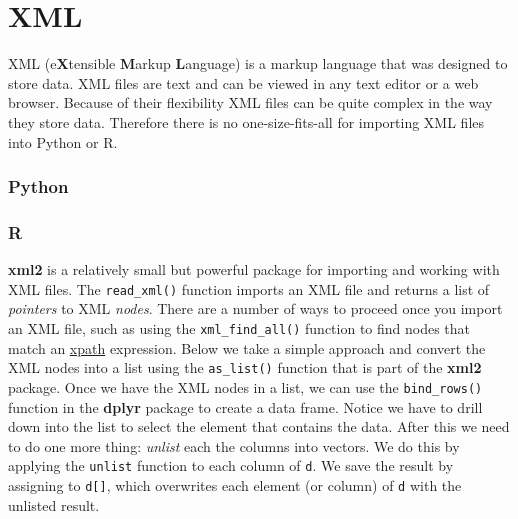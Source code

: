 \documentclass[
]{book}
\begin{document}
\hypertarget{xml}{%
\section{XML}\label{xml}}

XML (e\textbf{X}tensible \textbf{M}arkup \textbf{L}anguage) is a markup language that was designed to store data. XML files are text and can be viewed in any text editor or a web browser. Because of their flexibility XML files can be quite complex in the way they store data. Therefore there is no one-size-fits-all for importing XML files into Python or R.

\hypertarget{python-13}{%
\subsubsection*{Python}\label{python-13}}

\hypertarget{r-13}{%
\subsubsection*{R}\label{r-13}}

\textbf{xml2} is a relatively small but powerful package for importing and working with XML files. The \texttt{read\_xml()} function imports an XML file and returns a list of \emph{pointers} to XML \emph{nodes}. There are a number of ways to proceed once you import an XML file, such as using the \texttt{xml\_find\_all()} function to find nodes that match an \href{https://www.w3schools.com/xml/xpath_intro.asp}{xpath} expression. Below we take a simple approach and convert the XML nodes into a list using the \texttt{as\_list()} function that is part of the \textbf{xml2} package. Once we have the XML nodes in a list, we can use the \texttt{bind\_rows()} function in the \textbf{dplyr} package to create a data frame. Notice we have to drill down into the list to select the element that contains the data. After this we need to do one more thing: \emph{unlist} each the columns into vectors. We do this by applying the \texttt{unlist} function to each column of \texttt{d}. We save the result by assigning to \texttt{d{[}{]}}, which overwrites each element (or column) of \texttt{d} with the unlisted result.
\end{document}
